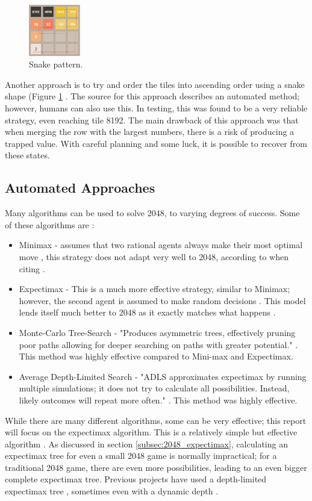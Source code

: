 \documentclass{article}
\begin{document}
\begin{figure}
    \centering
    \includegraphics[width=0.2\textwidth]{bitmap.png}
    \caption{Snake pattern.}
    \label{fig:snake}
\end{figure}

Another approach is to try and order the tiles into ascending order using a snake shape (Figure \ref{fig:snake} \cite{aiplays2048}. The source for this approach describes an automated method; however,
humans can also use this. In testing, this was found to be a very reliable strategy, even reaching tile 8192. The main drawback of this approach was that when merging the row with the largest numbers, there is a risk of producing a trapped value. With careful planning and some luck, it is possible to recover from these states.
\subsection{Automated Approaches}
\label{subsec:automated_techniques}
Many algorithms can be used to solve 2048, to varying degrees of success. Some of these algorithms are \cite{approches2048}:
\begin{itemize}
    \item Minimax - assumes that two rational agents always make their most optimal move \cite{minmaxCS2910}, this strategy does not adapt very well to 2048, according to \cite{approches2048} when citing \cite{minmax2048}.
    \item Expectimax - This is a much more effective strategy, similar to Minimax; however, the second agent is assumed to make random decisions \cite[p.~200]{russell2010artificial}. This model lends itself much better to 2048 as it exactly matches what happens \cite{expectimax2048}.
    \item Monte-Carlo Tree-Search - "Produces asymmetric trees, effectively pruning poor paths allowing for deeper searching on paths with greater potential." \cite{approches2048}. This method was highly effective compared to Mini-max and Expectimax.
    \item Average Depth-Limited Search - "ADLS approximates expectimax by running multiple simulations; it does not try to calculate all possibilities. Instead, likely outcomes will repeat more often." \cite {approches2048}. This method was highly effective.
\end{itemize}
While there are many different algorithms, some can be very effective; this report will focus on the expectimax algorithm. This is a relatively simple but effective algorithm \cite{expectimax2048}. As discussed in section \ref{subsec:2048_expectimax}, calculating an expectimax tree for even a small 2048 game is normally impractical; for a traditional 2048 game, there are even more possibilities, leading to an even bigger complete expectimax tree. Previous projects have used a depth-limited expectimax tree \cite{aiplays2048}, sometimes even with a dynamic depth \cite{expectimax2048}.
\end{document}
